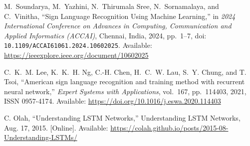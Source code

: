 \documentclass[12pt]{article}
\begin{document}
\begin{thebibliography}{99}
M.~Soundarya, M.~Yazhini, N.~Thirumala Sree, N.~Sornamalaya, and C.~Vinitha, 
“Sign Language Recognition Using Machine Learning,” 
in \emph{2024 International Conference on Advances in Computing, Communication and Applied Informatics (ACCAI)}, 
Chennai, India, 2024, pp.~1--7, 
doi: \texttt{10.1109/ACCAI61061.2024.10602025}.
Available: \url{https://ieeexplore.ieee.org/document/10602025}

C.~K.~M. Lee, K.~K.~H. Ng, C.-H. Chen, H.~C.~W. Lau, S.~Y. Chung, and T. Tsoi, 
“American sign language recognition and training method with recurrent neural network,” 
\textit{Expert Systems with Applications}, vol.~167, pp.~114403, 2021,  
ISSN 0957-4174.  
Available: \url{https://doi.org/10.1016/j.eswa.2020.114403} 

C. Olah, 
“Understanding LSTM Networks,” 
Understanding LSTM Networks, Aug. 17, 2015. [Online].  
Available: \url{https://colah.github.io/posts/2015-08-Understanding-LSTMs/}


\end{thebibliography}
\end{document}
